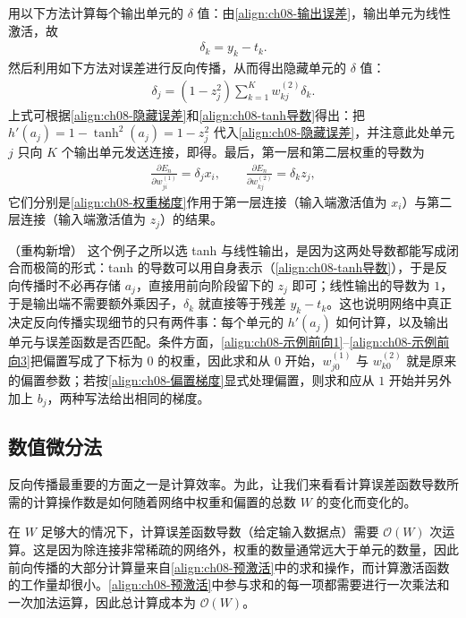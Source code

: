 \documentclass[../../main.tex]{subfiles}
\begin{document}
\begin{solution}
用以下方法计算每个输出单元的 $\delta$ 值：由\eqref{align:ch08-输出误差}，输出单元为线性激活，故
\begin{align*}
\delta_k=y_k-t_k .
\end{align*}
然后利用如下方法对误差进行反向传播，从而得出隐藏单元的 $\delta$ 值：
\begin{align*}
\delta_j=\left(1-z_j^{2}\right)\sum_{k=1}^{K}w_{kj}^{(2)}\delta_k .
\end{align*}
上式可根据\eqref{align:ch08-隐藏误差}和\eqref{align:ch08-tanh导数}得出：把 $h'(a_j)=1-\tanh^{2}(a_j)=1-z_j^{2}$ 代入\eqref{align:ch08-隐藏误差}，并注意此处单元 $j$ 只向 $K$ 个输出单元发送连接，即得。最后，第一层和第二层权重的导数为
\begin{align*}
\frac{\partial E_n}{\partial w_{ji}^{(1)}}=\delta_j x_i,\qquad
\frac{\partial E_n}{\partial w_{kj}^{(2)}}=\delta_k z_j ,
\end{align*}
它们分别是\eqref{align:ch08-权重梯度}作用于第一层连接（输入端激活值为 $x_i$）与第二层连接（输入端激活值为 $z_j$）的结果。
\end{solution}

\begin{remark}（重构新增）
这个例子之所以选 tanh 与线性输出，是因为这两处导数都能写成闭合而极简的形式：tanh 的导数可以用自身表示（\eqref{align:ch08-tanh导数}），于是反向传播时不必再存储 $a_j$，直接用前向阶段留下的 $z_j$ 即可；线性输出的导数为 $1$，于是输出端不需要额外乘因子，$\delta_k$ 就直接等于残差 $y_k-t_k$。这也说明网络中真正决定反向传播实现细节的只有两件事：每个单元的 $h'(a_j)$ 如何计算，以及输出单元与误差函数是否匹配。条件方面，\eqref{align:ch08-示例前向1}--\eqref{align:ch08-示例前向3}把偏置写成了下标为 $0$ 的权重，因此求和从 $0$ 开始，$w_{j0}^{(1)}$ 与 $w_{k0}^{(2)}$ 就是原来的偏置参数；若按\eqref{align:ch08-偏置梯度}显式处理偏置，则求和应从 $1$ 开始并另外加上 $b_j$，两种写法给出相同的梯度。
\end{remark}

\subsection{数值微分法}\label{subsection:ch08-数值微分}

反向传播最重要的方面之一是计算效率。为此，让我们来看看计算误差函数导数所需的计算操作数是如何随着网络中权重和偏置的总数 $W$ 的变化而变化的。

在 $W$ 足够大的情况下，计算误差函数导数（给定输入数据点）需要 $\mathcal{O}(W)$ 次运算。这是因为除连接非常稀疏的网络外，权重的数量通常远大于单元的数量，因此前向传播的大部分计算量来自\eqref{align:ch08-预激活}中的求和操作，而计算激活函数的工作量却很小。\eqref{align:ch08-预激活}中参与求和的每一项都需要进行一次乘法和一次加法运算，因此总计算成本为 $\mathcal{O}(W)$。
\end{document}
